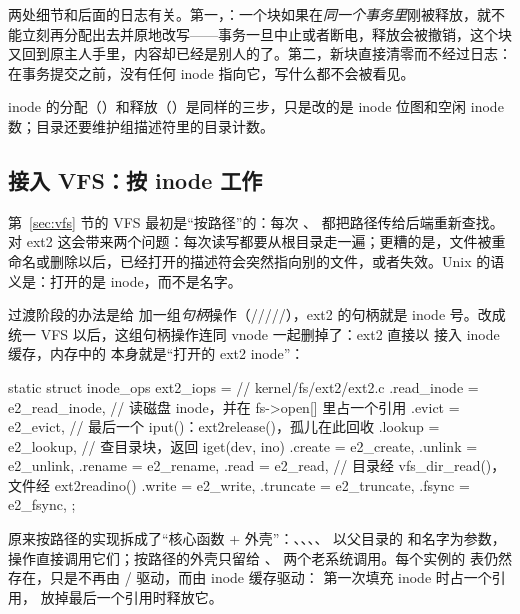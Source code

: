 两处细节和后面的日志有关。第一，：一个块如果在\emph{同一个事务里}刚被释放，就不能立刻再分配出去并原地改写——事务一旦中止或者断电，释放会被撤销，这个块又回到原主人手里，内容却已经是别人的了。第二，新块直接清零而不经过日志：在事务提交之前，没有任何 inode 指向它，写什么都不会被看见。

inode 的分配（）和释放（）是同样的三步，只是改的是 inode 位图和空闲 inode 数；目录还要维护组描述符里的目录计数。

\subsection{接入 VFS：按 inode 工作}

第~\ref{sec:vfs} 节的 VFS 最初是“按路径”的：每次 、 都把路径传给后端重新查找。对 ext2 这会带来两个问题：每次读写都要从根目录走一遍；更糟的是，文件被重命名或删除以后，已经打开的描述符会突然指向别的文件，或者失效。Unix 的语义是：打开的是 inode，而不是名字。

过渡阶段的办法是给  加一组\emph{句柄}操作（/////），ext2 的句柄就是 inode 号。改成统一 VFS 以后，这组句柄操作连同 vnode 一起删掉了：ext2 直接以  接入 inode 缓存，内存中的  本身就是“打开的 ext2 inode”：

\begin{ccode}
static struct inode_ops ext2_iops = {        // kernel/fs/ext2/ext2.c
  .read_inode = e2_read_inode,   // 读磁盘 inode，并在 fs->open[] 里占一个引用
  .evict      = e2_evict,        // 最后一个 iput()：ext2release()，孤儿在此回收
  .lookup     = e2_lookup,       // 查目录块，返回 iget(dev, ino)
  .create     = e2_create,  .unlink = e2_unlink,  .rename = e2_rename,
  .read       = e2_read,         // 目录经 vfs_dir_read()，文件经 ext2readino()
  .write      = e2_write,   .truncate = e2_truncate,  .fsync = e2_fsync,
};
\end{ccode}

原来按路径的实现拆成了“核心函数 + 外壳”：、、、、 以父目录的  和名字为参数， 操作直接调用它们；按路径的外壳只留给 、 两个老系统调用。每个实例的  表仍然存在，只是不再由 / 驱动，而由 inode 缓存驱动： 第一次填充 inode 时占一个引用， 放掉最后一个引用时释放它。

